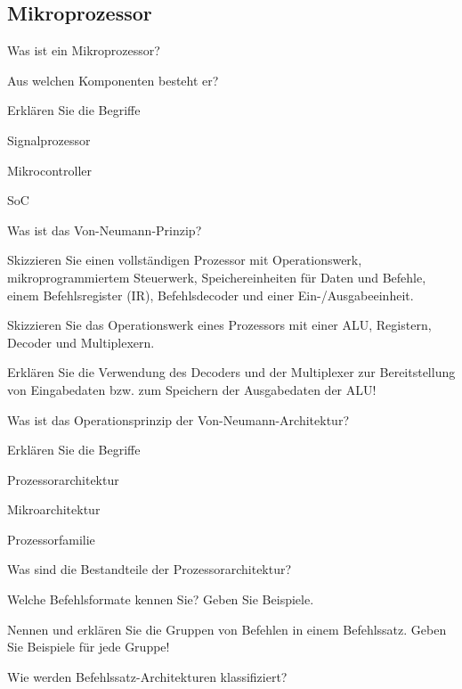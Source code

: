 \documentclass
[
  draft    = true,
  fontsize = 11pt,
  parskip  = half-,
  BCOR     = 0pt,
  DIV      = 11,
  ngerman,
  dvipsnames
]
{scrartcl}
\begin{document}
\subsection*{Mikroprozessor}
\begin{mytemize}
  \item Was ist ein Mikroprozessor?
        \begin{mytemize}
          \item Aus welchen Komponenten besteht er?
        \end{mytemize}
  \item Erklären Sie die Begriffe
        \begin{mytemize}
          \item Signalprozessor
          \item Mikrocontroller
          \item SoC
        \end{mytemize}
  \item Was ist das Von-Neumann-Prinzip?
  \item Skizzieren Sie einen vollständigen Prozessor mit Operationswerk, mikroprogrammiertem Steuerwerk, Speichereinheiten für Daten und Befehle, einem Befehlsregister (IR), Befehlsdecoder und einer Ein-/Ausgabeeinheit.
  \item Skizzieren Sie das Operationswerk eines Prozessors mit einer ALU, Registern, Decoder und Multiplexern.
  \item Erklären Sie die Verwendung des Decoders und der Multiplexer zur Bereitstellung von Eingabedaten bzw. zum Speichern der Ausgabedaten der ALU!
  \item Was ist das Operationsprinzip der Von-Neumann-Architektur?
  \item Erklären Sie die Begriffe
        \begin{mytemize}
          \item Prozessorarchitektur
          \item Mikroarchitektur
          \item Prozessorfamilie
        \end{mytemize}
  \item Was sind die Bestandteile der Prozessorarchitektur?
  \item Welche Befehlsformate kennen Sie? Geben Sie Beispiele.
  \item Nennen und erklären Sie die Gruppen von Befehlen in einem Befehlssatz. Geben Sie Beispiele für jede Gruppe!
  \item Wie werden Befehlssatz-Architekturen klassifiziert?

\end{mytemize}
\end{document}
